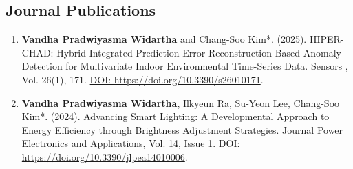\subsection{Journal Publications}

\begin{enumerate}

\item \textbf{Vandha Pradwiyasma Widartha} and Chang-Soo Kim*. (2025). HIPER-CHAD: Hybrid Integrated Prediction-Error Reconstruction-Based Anomaly Detection for Multivariate Indoor Environmental Time-Series Data. Sensors , Vol. 26(1), 171. \url{DOI: https://doi.org/10.3390/s26010171}. 
  
  \item \textbf{Vandha Pradwiyasma Widartha}, Ilkyeun Ra, Su-Yeon Lee, Chang-Soo Kim*. (2024). Advancing Smart Lighting: A Developmental Approach to Energy Efficiency through Brightness Adjustment Strategies. Journal Power Electronics and Applications, Vol. 14, Issue 1. \url{DOI: https://doi.org/10.3390/jlpea14010006}. 


  
\end{enumerate}


